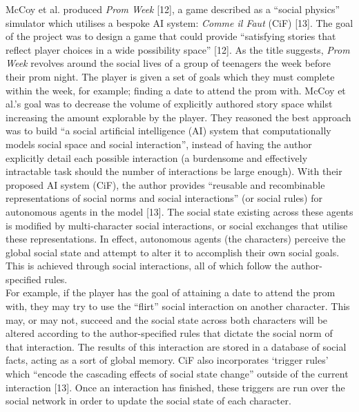 \documentclass{sig-alternate-05-2015}
\begin{document}
McCoy et al. produced \textit{Prom Week} [12], a game described as a ``social physics'' simulator which utilises a bespoke AI system: \textit{Comme il Faut} (CiF) [13]. The goal of the project was to design a game that could provide ``satisfying stories that reflect player choices in a wide possibility space'' [12].
As the title suggests, \textit{Prom Week} revolves around the social lives of a group of teenagers the week before their prom night. The player is given a set of goals which they must complete within the week, for example; finding a date to attend the prom with. McCoy et al.'s goal was to decrease the volume of explicitly authored story space whilst increasing the amount explorable by the player. They reasoned the best approach was to build ``a social artificial intelligence (AI) system that computationally models social space and social interaction'', instead of having the author explicitly detail each possible interaction (a burdensome and effectively intractable task should the number of interactions be large enough). With their proposed AI system (CiF), the author provides ``reusable and recombinable representations of social norms and social interactions'' (or social rules) for autonomous agents in the model [13]. The social state existing across these agents is modified by multi-character social interactions, or social exchanges that utilise these representations. In effect, autonomous agents (the characters) perceive the global social state and attempt to alter it to accomplish their own social goals. This is achieved through social interactions, all of which follow the author-specified rules.\\

For example, if the player has the goal of attaining a date to attend the prom with, they may try to use the ``flirt'' social interaction on another character. This may, or may not, succeed and the social state across both characters will be altered according to the author-specified rules that dictate the social norm of that interaction. The results of this interaction are stored in a database of social facts, acting as a sort of global memory. CiF also incorporates `trigger rules' which ``encode the cascading effects of social state change'' outside of the current interaction [13]. Once an interaction has finished, these triggers are run over the social network in order to update the social state of each character.
\end{document}
